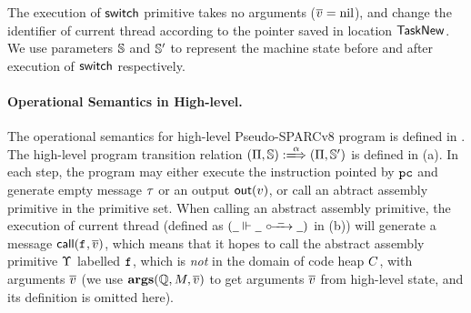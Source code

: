 The execution of $\mathsf{switch}{}$ primitive takes no arguments 
($\overline{v} = \text{nil}$), and change the identifier 
of current thread according to the pointer saved 
in location $\mathsf{TaskNew}$. We use parameters $\mathbb{S}$ 
and $\mathbb{S}'$ to represent the machine state before 
and after execution of $\mathsf{switch}{}$ respectively. 

\paragraph{\textbf{Operational Semantics in High-level.}} 
The operational semantics for high-level Pseudo-SPARCv8 program 
is defined in \Fig{\ref{fig:selected-opsem-high-level-prog}}. 
The high-level program transition relation 
$\HGlobTrans{(\HMd, \hpstate)}{\hmsg}{(\HMd, \hpstate')}$ is defined 
in \Fig{\ref{fig:selected-opsem-high-level-prog}} (a). In each step, 
the program may either execute the instruction pointed by $\texttt{pc}$   
and generate empty message $\tau$ or an output $\textsf{out}({v})$, 
or call  an abtract assembly primitive in the primitive set.
When calling an abstract assembly primitive, 
the execution of current thread (defined as 
$(\hlocalstep{\notCare}{\notCare}{\ \notCare \ }{\notCare})$ in 
\Fig{\ref{fig:selected-opsem-high-level-prog}} (b)) will generate 
a message $\textsf{call}({\texttt{f}_{}, \overline{v}})$, which means that it 
hopes to call the abstract assembly primitive $\Upsilon$ labelled 
$\texttt{f}_{}$, which is {\it not} in the domain of code heap $C$, 
with arguments $\overline{v}$ 
(we use $\textbf{args}(\mathbb{Q}, M, \overline{v})$ 
to get arguments $\overline{v}$ 
from high-level state, and its definition is omitted here). 

